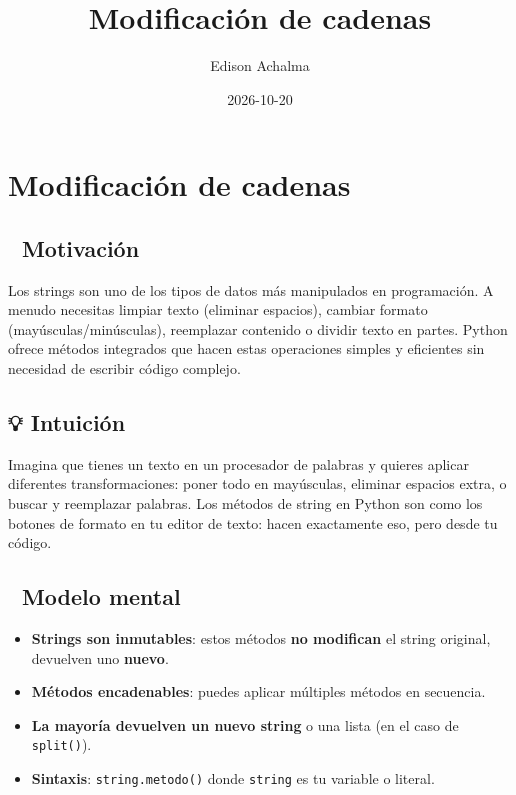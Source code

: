 \documentclass[
  doc,
  floatsintext,
  longtable,
  a4paper,
  nolmodern,
  notxfonts,
  notimes,
  12pt,
  colorlinks=true,linkcolor=blue,citecolor=blue,urlcolor=blue]{apa7}
\title{Modificación de cadenas}
\author{Edison Achalma}
\affiliation{
{Escuela Profesional de Economía, Universidad Nacional de San Cristóbal
de Huamanga}}
\date{2026-10-20}
\providecommand{\tightlist}{%
  \setlength{\itemsep}{0pt}\setlength{\parskip}{0pt}}
\begin{document}
\maketitle


\hypertarget{toc}{}
\tableofcontents
\newpage
\section[Introduction]{Modificación de cadenas}

\setcounter{secnumdepth}{3}

\setlength\LTleft{0pt}




\subsection{🎯 Motivación}\label{motivaciuxf3n}

Los strings son uno de los tipos de datos más manipulados en
programación. A menudo necesitas limpiar texto (eliminar espacios),
cambiar formato (mayúsculas/minúsculas), reemplazar contenido o dividir
texto en partes. Python ofrece métodos integrados que hacen estas
operaciones simples y eficientes sin necesidad de escribir código
complejo.

\subsection{💡 Intuición}\label{intuiciuxf3n}

Imagina que tienes un texto en un procesador de palabras y quieres
aplicar diferentes transformaciones: poner todo en mayúsculas, eliminar
espacios extra, o buscar y reemplazar palabras. Los métodos de string en
Python son como los botones de formato en tu editor de texto: hacen
exactamente eso, pero desde tu código.

\subsection{🧠 Modelo mental}\label{modelo-mental}

\begin{itemize}
\tightlist
\item
  \textbf{Strings son inmutables}: estos métodos \textbf{no modifican}
  el string original, devuelven uno \textbf{nuevo}.
\item
  \textbf{Métodos encadenables}: puedes aplicar múltiples métodos en
  secuencia.
\item
  \textbf{La mayoría devuelven un nuevo string} o una lista (en el caso
  de \texttt{split()}).
\item
  \textbf{Sintaxis}: \texttt{string.metodo()} donde \texttt{string} es
  tu variable o literal.
\end{itemize}
\end{document}
